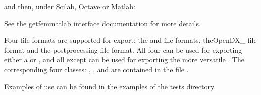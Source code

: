 \documentclass[a4paper,11pt,english]{sphinxmanual}
\begin{document}
and then, under Scilab, Octave or Matlab:

\begin{sphinxVerbatim}[commandchars=\\\{\}]
 
 
 
\end{sphinxVerbatim}

See the getfem\sphinxhyphen{}matlab interface documentation for more details.

Four file formats are supported for export: the  and  file
formats, the\textasciigrave{}OpenDX\textasciigrave{}\_ file format and the  post\sphinxhyphen{}processing file
format. All four can be used for exporting either a  or , and
all except  can be used for exporting the more versatile .
The corresponding four classes: , ,
 and  are contained in the file
.

Examples of use can be found in the examples of the tests directory.
\end{document}
